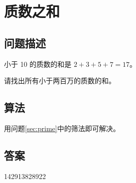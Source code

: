 \section{质数之和}\label{sec:problem10}
\subsection{问题描述}
\begin{tcolorbox}
小于 10 的质数的和是 \(2 + 3 + 5 + 7 = 17\)。

请找出所有小于两百万的质数的和。
\end{tcolorbox}

\subsection{算法}
用问题\ref{sec:prime}中的筛法即可解决。

\subsection{答案}
142913828922
